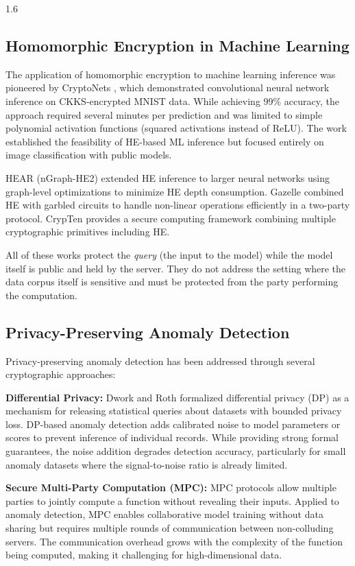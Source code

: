 \begin{spacing}{1.6}
\subsection{Homomorphic Encryption in Machine Learning}

The application of homomorphic encryption to machine learning inference was
pioneered by CryptoNets \cite{gilad}, which demonstrated convolutional neural
network inference on CKKS-encrypted MNIST data. While achieving 99\% accuracy,
the approach required several minutes per prediction and was limited to simple
polynomial activation functions (squared activations instead of ReLU). The
work established the feasibility of HE-based ML inference but focused entirely
on image classification with public models.

HEAR \cite{hear} (nGraph-HE2) extended HE inference to larger neural networks
using graph-level optimizations to minimize HE depth consumption. Gazelle
\cite{gazelle} combined HE with garbled circuits to handle non-linear
operations efficiently in a two-party protocol. CrypTen \cite{crypten} provides
a secure computing framework combining multiple cryptographic primitives
including HE.

All of these works protect the \textit{query} (the input to the model) while
the model itself is public and held by the server. They do not address the
setting where the data corpus itself is sensitive and must be protected from
the party performing the computation.

\subsection{Privacy-Preserving Anomaly Detection}

Privacy-preserving anomaly detection has been addressed through several
cryptographic approaches:

\textbf{Differential Privacy:} Dwork and Roth \cite{dwork} formalized
differential privacy (DP) as a mechanism for releasing statistical queries
about datasets with bounded privacy loss. DP-based anomaly detection adds
calibrated noise to model parameters or scores to prevent inference of
individual records. While providing strong formal guarantees, the noise addition
degrades detection accuracy, particularly for small anomaly datasets where the
signal-to-noise ratio is already limited.

\textbf{Secure Multi-Party Computation (MPC):} MPC protocols allow multiple
parties to jointly compute a function without revealing their inputs. Applied
to anomaly detection, MPC enables collaborative model training without data
sharing but requires multiple rounds of communication between non-colluding
servers. The communication overhead grows with the complexity of the function
being computed, making it challenging for high-dimensional data.


\end{spacing}

